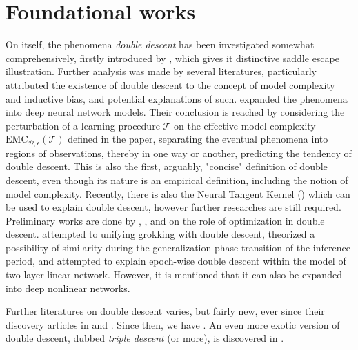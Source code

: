 \documentclass[
  journal=largetwo,
  simfonts=false,
  year=2025,
  volume=37,
]{cup-journal}
\begin{document}
\section{Foundational works}

On itself, the phenomena \textit{double descent} has been investigated somewhat comprehensively, firstly introduced by \cite{belkin_reconciling_2019}, which gives it distinctive saddle escape illustration. Further analysis was made by several literatures, particularly attributed the existence of double descent to the concept of model complexity and inductive bias, and potential explanations of such. \cite{nakkiran_deep_2019} expanded the phenomena into deep neural network models. Their conclusion is reached by considering the perturbation of a learning procedure $\mathcal{T}$ on the effective model complexity $\mathrm{EMC}_{\mathcal{D},\epsilon}(\mathcal{T})$ defined in the paper, separating the eventual phenomena into regions of observations, thereby in one way or another, predicting the tendency of double descent. This is also the first, arguably, "concise" definition of double descent, even though its nature is an empirical definition, including the notion of model complexity. Recently, there is also the Neural Tangent Kernel (\cite{Jacot:2018:NTK}) which can be used to explain double descent, however further researches are still required. Preliminary works are done by \cite{lafon_understanding_2024}, \cite{schaeffer_double_2023}, and \cite{liu2023understandingroleoptimizationdouble} on the role of optimization in double descent. \cite{davies_unifying_2023} attempted to unifying grokking with double descent, theorized a possibility of similarity during the generalization phase transition of the inference period, and \cite{olmin2024understandingepochwisedoubledescent} attempted to explain epoch-wise double descent within the model of two-layer linear network. However, it is mentioned that it can also be expanded into deep nonlinear networks. 

Further literatures on double descent varies, but fairly new, ever since their discovery articles in \cite{belkin_reconciling_2019} and \cite{nakkiran_deep_2019}. Since then, we have \cite{shi2024homophilymodulatesdoubledescent,schaeffer_double_2023,quetu_can_2023,lafon_understanding_2024,neal2019biasvariancetradeofftextbooksneed,davies_unifying_2023,quetu_can_2023-1,liu2023understandingroleoptimizationdouble,mei2020generalizationerrorrandomfeatures,mei2019generalization,adlam2020understandingdoubledescentrequires,transtrum2025egaddoubledescentexplained,liu2021kernelregressionhighdimensions,allerbo2025changingkerneltrainingleads,pezeshki2021multiscalefeaturelearningdynamics,brellmann2024on,nakkiran2019moredata,mei2019randomfeatures,heckel2020early,nakkiran2020regularization,Belkin_2020,Yang_2024,spiess2023doublesingledescentcausal,nakkiran2021optimalregularizationmitigatedouble,zhang2024manipulatingsparsedoubledescent,cherkassky2024understand,nakkiran2019datahurtlinearregression}. An even more exotic version of double descent, dubbed \textit{triple descent} (or more), is discovered in \cite{d_ascoli_triple_2020}. 
\end{document}
